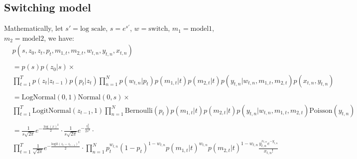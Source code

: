 \newpage
\subsection{Switching model}
Mathematically, let $s'=\text{log scale}$, $s=e^{s'}$, $w=\text{switch}$, $m_1=\text{model1}$, $m_2=\text{model2}$, we have:
\begin{align*}
     & p(s,z_0,z_t,p_t,m_{1,t},m_{2,t},w_{t,n},y_{t,n},x_{t,n})                                                                                             \\\\
     & =p(s)p(z_0|s) \times                                                                                                                                 \\
     & \prod_{t=1}^T p(z_t|z_{t-1}) p(p_t|z_t) 
     \prod_{n=1}^N p(w_{t,n}|p_t) 
     p(m_{1,t}|t) p(m_{2,t}|t) p(y_{t,n}|w_{t,n},m_{1,t},m_{2,t}) 
     p(x_{t,n},y_{t,n}) \\\\
     & =\text{LogNormal}(0,1)
    \text{Normal}(0,s) \times                                                                                                                               \\
     & \prod_{t=1}^T \text{LogitNormal}(z_{t-1},1)
    \prod_{n=1}^N \text{Bernoulli}(p_t)
    p(m_{1,t}|t) p(m_{2,t}|t)
    p(y_{t,n}|w_{t,n},m_{1,t},m_{2,t})
    \text{Poisson}(y_{t,n})                                                                                                                                 \\\\
     & =\frac{1}{s\sqrt{2\pi}}e^{-\frac{\log(x)^2}{2}} \cdot
    \frac{1}{s\sqrt{2\pi}}e^{-\frac{z_0^2}{2s^2}} \cdot \\
    &\prod_{t=1}^T \frac{1}{\sqrt{2\pi}} e^{-\frac{\text{logit}(z_t-z_{t-1})^2}{2}} \cdot
    \prod_{n=1}^N p_t^{w_{t,n}} (1-p_t)^{1-w_{t,n}}
    p(m_{1,t}|t)^{w_{t,n}} p(m_{2,t}|t)^{1-w_{t,n}}
    \frac{y_{t,n}^{x_{t,n}} e^{-y_{t,n}}}{x_{t,n}!}
\end{align*}


